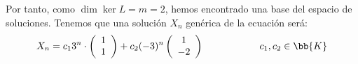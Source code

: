 \begin{ejemplo}
    Por tanto, como $\dim \ker L = m=2$, hemos encontrado una base del espacio de soluciones. Tenemos que una solución $X_n$ genérica de la ecuación será:
    \begin{equation*}
        X_n = c_13^n\cdot \left(
        \begin{array}{c}
            1\\1
        \end{array}
        \right) +c_2(-3)^n\left(
        \begin{array}{c}
            1\\-2
        \end{array}
        \right)\hspace{2cm} c_1,c_2\in \bb{K}
    \end{equation*}

        \begin{comment}
        \item[Opción 2.] Diagonalizando la matriz $M$:
        \begin{align*}
            X_n &= \begin{pmatrix}
                1 & 2\\
                4 & -1
            \end{pmatrix}^nX_0 =\\
            &=
            \left(
            \begin{array}{cc}
                1& 1\\
                1 & -2
            \end{array}
            \right)
            \left(
            \begin{array}{cc}
                3 & 0\\
                0 & -3
            \end{array}
            \right)^n
            \left(
            \begin{array}{cc}
                1& 1\\
                1 & -2
            \end{array}
            \right)^{-1}X_0
            =\\&= \left(\begin{matrix}
            {\left(-1\right)^n\cdot 3^{n-1}+2\cdot3^{n-1}} & {-\left(-1\right)^n\cdot3^{n-1}+3^{n-1}}\\
            {-2\cdot\left(-1\right)^n\cdot3^{n-1}+2\cdot3^{n-1}} & {2\cdot\left(-1\right)^n\cdot3^{n-1}+3^{n-1}}
            \end{matrix}\right)
            X_0

\end{comment}
\end{ejemplo}
